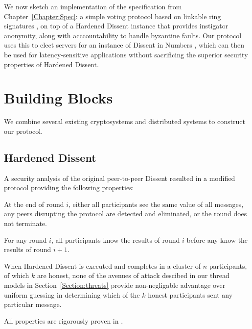 We now sketch an implementation of the specification from
Chapter~\ref{Chapter:Spec}: a simple voting protocol based on linkable ring
signatures \cite{lrs}, on top of a Hardened Dissent \cite{sec} instance that
provides instigator anonymity, along with acccountability to handle byzantine
faults. Our protocol uses this to elect servers for an instance of Dissent in
Numbers \cite{din}, which can then be used for latency-sensitive applications
without sacrificing the superior security properties of Hardened Dissent.
\section{Building Blocks}
We combine several existing cryptosystems and distributed systems to construct
our protocol.
\subsection{Hardened Dissent}
A security analysis of the original peer-to-peer Dissent resulted in a modified
protocol providing the following properties:
  \begin{theorem} At the end of round $i$, either all participants see the same
    value of all messages, any peers disrupting the protocol are detected and
    eliminated, or the round does not terminate.%
  \end{theorem}
  \begin{theorem} For any round $i$, all participants know the results of round
    $i$ before any know the results of round
    $i+1$.\end{theorem}\label{theorem:rounds}
  \begin{theorem}[Anonymity] When Hardened Dissent is executed and completes in a
    cluster of $n$ participants, of which $k$ are honest, none of the avenues of
    attack descibed in our thread models in Section~\ref{Section:threats}
    provide non-negligable advantage over uniform guessing in determining which
    of the $k$ honest participants sent any particular message.
  \end{theorem}\label{theorem:anon}
  All properties are rigorously proven in \cite{sec}.


